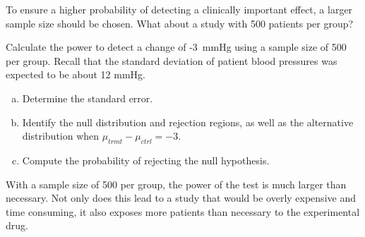 To ensure a higher probability of detecting a clinically important effect, a larger sample size should be chosen. What about a study with 500 patients per group?

\begin{exercisewrap}
\begin{nexercise}
Calculate the power to detect a change of -3~mmHg  using a sample size of 500 per group. Recall that the standard deviation of patient blood pressures was expected to be about 12 mmHg.\footnotemark{}
\begin{enumerate}[(a)]
\setlength{\itemsep}{0mm}
\item Determine the standard error.
\item Identify the null distribution and rejection regions, as well as the alternative distribution when $\mu_{trmt} - \mu_{ctrl} = -3$.
\item Compute the probability of rejecting the null hypothesis.
\end{enumerate}
\end{nexercise}
\end{exercisewrap}

With a sample size of 500 per group, the power of the test is much larger than necessary. Not only does this lead to a study that would be overly expensive and time consuming, it also exposes more patients than necessary to the experimental drug. 

